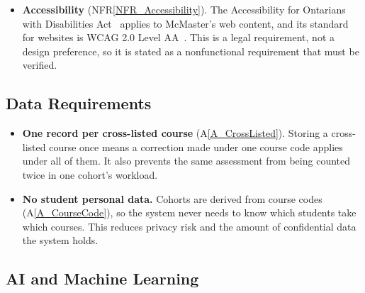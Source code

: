 \documentclass[12pt]{article}
\newcommand{\nfrref}[1]{NFR\ref{#1}}
\newcommand{\asref}[1]{A\ref{#1}}
\begin{document}
\begin{itemize}
\item \textbf{Accessibility} (\nfrref{NFR_Accessibility}). The Accessibility
  for Ontarians with Disabilities Act~\citep{AODA2005} applies to McMaster's web content, and its
  standard for websites is WCAG 2.0 Level AA~\citep{IASR2011, WCAG20}. This is a legal requirement, not a
  design preference, so it is stated as a nonfunctional requirement that must be
  verified.
\end{itemize}

\subsection{Data Requirements}

\begin{itemize}
\item \textbf{One record per cross-listed course} (\asref{A_CrossListed}).
  Storing a cross-listed course once means a correction made under one course
  code applies under all of them. It also prevents the same assessment from
  being counted twice in one cohort's workload.

\item \textbf{No student personal data.} Cohorts are derived from course codes
  (\asref{A_CourseCode}), so the system never needs to know which students
  take which courses. This reduces privacy risk and the amount of confidential
  data the system holds.
\end{itemize}

\subsection{AI and Machine Learning}
\end{document}
